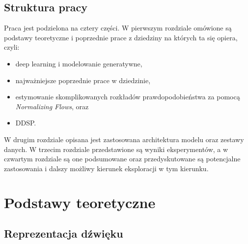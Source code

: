 \documentclass[magisterska]{pracamgr}
\begin{document}
\section*{Struktura pracy}

Praca jest podzielona na cztery części. W pierwszym rozdziale omówione są podstawy teoretyczne i poprzednie prace z dziedziny na których ta się opiera, czyli:
\begin{itemize}
    \setlength\itemsep{0em}
    \item deep learning i modelowanie generatywne,
    \item najważniejsze poprzednie prace w dziedzinie,
    \item estymowanie skomplikowanych rozkładów prawdopodobieństwa za pomocą \textit{Normalizing Flows}, oraz
    \item DDSP.
\end{itemize}
W drugim rozdziale opisana jest zastosowana architektura modelu oraz zestawy danych. W trzecim rozdziale przedstawione są wyniki eksperymentów, a w czwartym rozdziale są one podsumowane oraz przedyskutowane są potencjalne zastosowania i dalszy możliwy kierunek eksploracji w tym kierunku.

\chapter{Podstawy teoretyczne}


\section{Reprezentacja dźwięku}
\end{document}
